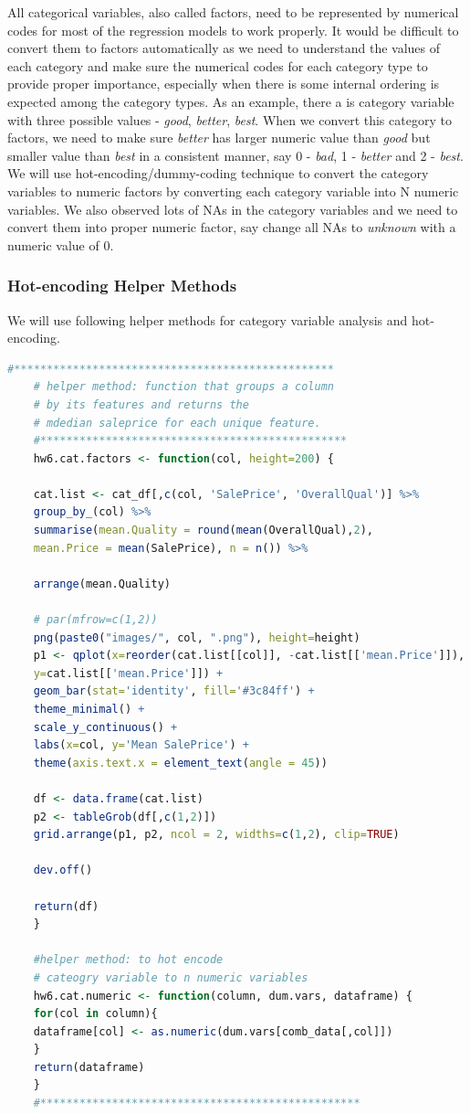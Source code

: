 \documentclass[sigconf]{acmart}
\begin{document}
	
	All categorical variables, also called factors, need to be represented by numerical codes for most of the regression models to work properly. It would be difficult to convert them to factors automatically as we need to understand the values of each category and make sure the numerical codes for each category type to provide proper importance, especially when there is some internal ordering is expected among the category types. As an example, there a is category variable with three possible values - {\em good}, {\em better}, {\em best}. When we convert this category to factors, we need to make sure {\em better} has larger numeric value than {\em good} but smaller value than {\em best} in a consistent manner, say 0 - {\em bad}, 1 - {\em better} and 2 - {\em best}. We will use hot-encoding/dummy-coding technique to convert the category variables to numeric factors by converting each category variable into N numeric variables. We also observed lots of NAs in the category variables and we need to convert them into proper numeric factor, say change all NAs to {\em unknown} with a numeric value of 0.
	
	\subsubsection {Hot-encoding Helper Methods}
	
	
	We will use following helper methods for category variable analysis and hot-encoding.
	
	\begin{lstlisting}[language=R]
	#*************************************************
	# helper method: function that groups a column
	# by its features and returns the 
	# mdedian saleprice for each unique feature. 
	#***********************************************
	hw6.cat.factors <- function(col, height=200) { 
	
	cat.list <- cat_df[,c(col, 'SalePrice', 'OverallQual')] %>%
	group_by_(col) %>% 
	summarise(mean.Quality = round(mean(OverallQual),2),
	mean.Price = mean(SalePrice), n = n()) %>%
	
	arrange(mean.Quality)
	
	# par(mfrow=c(1,2))
	png(paste0("images/", col, ".png"), height=height)
	p1 <- qplot(x=reorder(cat.list[[col]], -cat.list[['mean.Price']]),
	y=cat.list[['mean.Price']]) +
	geom_bar(stat='identity', fill='#3c84ff') +
	theme_minimal() +
	scale_y_continuous() + 
	labs(x=col, y='Mean SalePrice') + 
	theme(axis.text.x = element_text(angle = 45))
	
	df <- data.frame(cat.list)
	p2 <- tableGrob(df[,c(1,2)])
	grid.arrange(p1, p2, ncol = 2, widths=c(1,2), clip=TRUE)
	
	dev.off()
	
	return(df)
	}
	
	#helper method: to hot encode 
	# cateogry variable to n numeric variables
	hw6.cat.numeric <- function(column, dum.vars, dataframe) {
	for(col in column){
	dataframe[col] <- as.numeric(dum.vars[comb_data[,col]])
	}
	return(dataframe)
	}
	#*************************************************
	\end{lstlisting}
	
\end{document}
